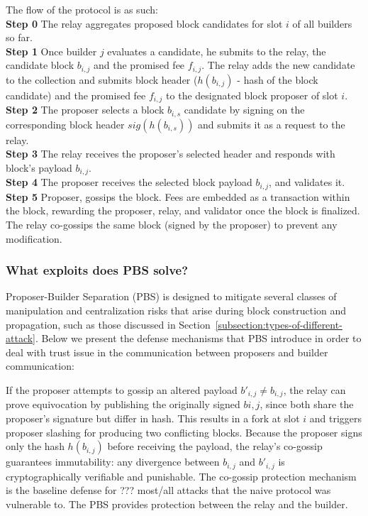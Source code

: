 The flow of the protocol is as such:
\\[16pt]

\noindent\textbf{Step 0} The relay aggregates proposed block candidates for slot $i$ of all builders so far.
\\[8pt]
\noindent\textbf{Step 1} Once builder $j$ evaluates a candidate, he submits to the relay, the candidate block $b_{i,j}$ and the promised fee $f_{i,j}$. The relay adds the new candidate to the collection and submits block header ($h(b_{i,j})$ - hash of the block candidate) and the promised fee $f_{i,j}$ to the designated block proposer of slot $i$.
\\[8pt]
\noindent\textbf{Step 2} The proposer selects a block $b_{i,s}$ candidate by signing on the corresponding block header $sig(h(b_{i,s}))$ and submits it as a request to the relay. 
\\[8pt]
\noindent\textbf{Step 3} The relay receives the proposer's selected header and responds with block's payload $b_{i,j}$.
\\[8pt]
\noindent\textbf{Step 4} The proposer receives the selected block payload $b_{i,j}$, and validates it.
\\[8pt]
\noindent\textbf{Step 5}
Proposer, gossips the block. Fees are embedded as a transaction within the block, rewarding the proposer, relay, and validator once the block is finalized.
The relay co-gossips the same block (signed by the proposer) to prevent any modification.



\subsubsection{What exploits does PBS solve?}
Proposer-Builder Separation (PBS) is designed to mitigate several classes of manipulation and centralization risks that arise during block construction and propagation, such as those discussed in Section~\ref{subsection:types-of-different-attack}. Below we present the defense mechanisms that PBS introduce in order to deal with trust issue in the communication between proposers and builder communication:

If the proposer attempts to gossip an altered payload $b'_{i,j} \neq b_{i,j}$, the relay can prove equivocation by publishing the originally signed $b{i,j}$, since both share the proposer’s signature but differ in hash.
This results in a fork at slot $i$ and triggers proposer slashing for producing two conflicting blocks.
Because the proposer signs only the hash $h(b_{i,j})$ before receiving the payload, the relay’s co-gossip guarantees immutability: any divergence between $b_{i,j}$ and $b'_{i,j}$ is cryptographically verifiable and punishable.
The co-gossip protection mechanism is the baseline defense for ??? most/all attacks that the naive protocol was vulnerable to. The PBS provides protection between the relay and the builder.

